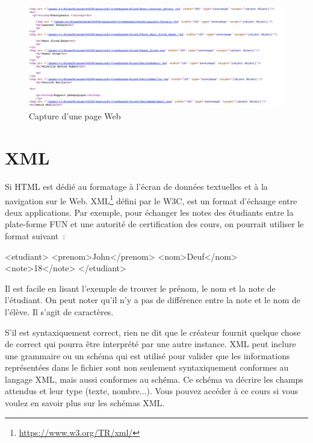 \begin{figure}[tbp]
\centerline{\includegraphics[width=1\columnwidth]{Pictures/Capture23.png}}
\caption{Capture d'une page Web}
\label{fig-Web-HTML}
\end{figure}


\section{XML}

Si \ac{HTML} est dédié au formatage à l'écran de données textuelles et à la navigation sur le Web. \ac{XML}\footnote{\url{https://www.w3.org/TR/xml/}} défini par le \ac{W3C}, est un format d’échange entre deux applications. Par exemple, pour échanger les notes des étudiants entre la plate-forme FUN et une autorité de certification des cours, on pourrait utiliser le format suivant~:

\begin{termc}[backgroundcolor=\color{gray!10}]
<etudiant>
   <prenom>John</prenom>
   <nom>Deuf</nom>
   <note>18</note>
</etudiant>

\end{termc}

Il est facile en lisant l'exemple de trouver le prénom, le nom et la note de l'étudiant. On peut noter qu'il n'y a pas de différence entre la note et le nom de l'élève. Il s'agit de caractères.

     \vspace{1em}

S'il est syntaxiquement correct, rien ne dit que le créateur fournit quelque chose de correct qui pourra être interprété par une autre instance.  \ac{XML} peut inclure une grammaire ou un schéma qui est utilisé pour valider que les informations représentées dans le fichier sont non seulement syntaxiquement conformes au langage \ac{XML}, mais aussi conformes au schéma. Ce schéma va décrire les champs attendus et leur type (texte, nombre...). Vous pouvez accéder à ce cours si vous voulez en savoir plus sur les schémas \ac{XML}.

